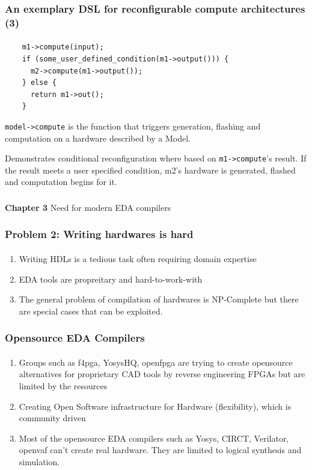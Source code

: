 \documentclass{beamer}
\begin{document}
\begin{frame}[fragile]
  \frametitle{An exemplary DSL for reconfigurable compute architectures (3)}
\framesubtitle{}
  \begin{verbatim}
    m1->compute(input);
    if (some_user_defined_condition(m1->output())) {
      m2->compute(m1->output());
    } else {
      return m1->out();
    }
\end{verbatim}
  \texttt{model->compute} is the function that triggers generation, flashing and
  computation on a hardware described by a Model.

  Demonstrates conditional reconfiguration where based on \texttt{m1->compute}'s
  result. If the result meets a user specified condition, m2's hardware is
  generated, flashed and computation begins for it.
\end{frame}

\begin{frame}[c,fragile]
  \frametitle{}

  \centering
  \textbf{Chapter 3} 
  \centering
  Need for modern EDA compilers
\end{frame}

\begin{frame}[fragile]
  \frametitle{Problem 2: Writing hardwares is hard}
  \framesubtitle{}
  \begin{enumerate}
    \item Writing HDLs is a tedious task often requiring domain expertise
    \item EDA tools are propreitary and hard-to-work-with
    \item The general problem of compilation of hardwares is NP-Complete but
      there are special cases that can be exploited.
  \end{enumerate}
\end{frame}


\begin{frame}[fragile]
  \frametitle{Opensource EDA Compilers}
  \framesubtitle{}
  \begin{enumerate}
    \item Groups such as f4pga, YosysHQ, openfpga are trying to create opensource
      alternatives for proprietary CAD tools by reverse engineering FPGAs
      but are limited by the resources 
    \item Creating Open Software infrastructure for Hardware (flexibility),
      which is community driven 
    \item Most of the opensource EDA compilers such as Yosys, CIRCT, Verilator,
      openvaf can't create real hardware. They are limited to
      logical synthesis and simulation.
  \end{enumerate}

\end{frame}
\end{document}
